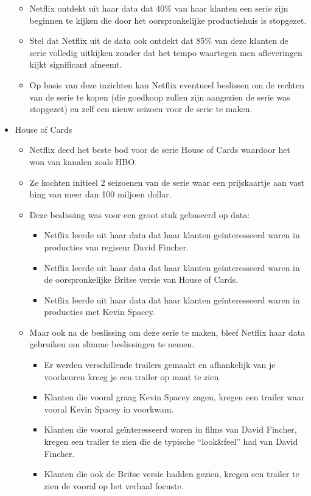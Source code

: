 \documentclass[]{tufte-book}
\providecommand{\tightlist}{%
  \setlength{\itemsep}{0pt}\setlength{\parskip}{0pt}}
\begin{document}
\begin{itemize}
  \begin{itemize}
  \tightlist
  \item
    Netflix ontdekt uit haar data dat 40\% van haar klanten een serie zijn beginnen te kijken die door het oorspronkelijke productiehuis is stopgezet.
  \item
    Stel dat Netflix uit de data ook ontdekt dat 85\% van deze klanten de serie volledig uitkijken zonder dat het tempo waartegen men afleveringen kijkt significant afneemt.
  \item
    Op basis van deze inzichten kan Netflix eventueel beslissen om de rechten van de serie te kopen (die goedkoop zullen zijn aangezien de serie was stopgezet) en zelf een nieuw seizoen voor de serie te maken.
  \end{itemize}
\item
  House of Cards

  \begin{itemize}
  \tightlist
  \item
    Netflix deed het beste bod voor de serie House of Cards waardoor het won van kanalen zoals HBO.
  \item
    Ze kochten initieel 2 seizoenen van de serie waar een prijskaartje aan vast hing van meer dan 100 miljoen dollar.
  \item
    Deze beslissing was voor een groot stuk gebaseerd op data:

    \begin{itemize}
    \tightlist
    \item
      Netflix leerde uit haar data dat haar klanten geïnteresseerd waren in producties van regiseur David Fincher.
    \item
      Netflix leerde uit haar data dat haar klanten geïnteresseerd waren in de oorspronkelijke Britse versie van House of Cards.
    \item
      Netflix leerde uit haar data dat haar klanten geïnteresseerd waren in producties met Kevin Spacey.
    \end{itemize}
  \item
    Maar ook na de beslissing om deze serie te maken, bleef Netflix haar data gebruiken om slimme beslissingen te nemen.

    \begin{itemize}
    \tightlist
    \item
      Er werden verschillende trailers gemaakt en afhankelijk van je voorkeuren kreeg je een trailer op maat te zien.
    \item
      Klanten die vooral graag Kevin Spacey zagen, kregen een trailer waar vooral Kevin Spacey in voorkwam.
    \item
      Klanten die vooral geïnteresseerd waren in films van David Fincher, kregen een trailer te zien die de typische ``look\&feel'' had van David Fincher.
    \item
      Klanten die ook de Britse versie hadden gezien, kregen een trailer te zien de vooral op het verhaal focuste.
    \end{itemize}
  \end{itemize}
\end{itemize}
\end{document}
